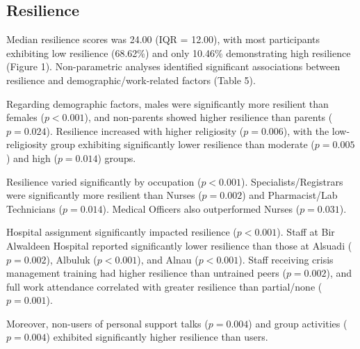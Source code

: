 \documentclass[12pt]{article}
\begin{document}
\subsection{Resilience}
Median resilience scores was 24.00 (IQR = 12.00), with most participants exhibiting low resilience (68.62\%) and only 10.46\% demonstrating high resilience (Figure 1). Non-parametric analyses identified significant associations between resilience and demographic/work-related factors (Table 5).

Regarding demographic factors, males were significantly more resilient than females ($p < 0.001$), and non-parents showed higher resilience than parents ($p = 0.024$). Resilience increased with higher religiosity ($p = 0.006$), with the low-religiosity group exhibiting significantly lower resilience than moderate ($p = 0.005$) and high ($p = 0.014$) groups.

Resilience varied significantly by occupation ($p < 0.001$). Specialists/Registrars were significantly more resilient than Nurses ($p = 0.002$) and Pharmacist/Lab Technicians ($p = 0.014$). Medical Officers also outperformed Nurses ($p = 0.031$).

Hospital assignment significantly impacted resilience ($p < 0.001$). Staff at Bir Alwaldeen Hospital reported significantly lower resilience than those at Alsuadi ($p = 0.002$), Albuluk ($p < 0.001$), and Alnau ($p < 0.001$). Staff receiving crisis management training had higher resilience than untrained peers ($p = 0.002$), and full work attendance correlated with greater resilience than partial/none ($p = 0.001$).

Moreover, non-users of personal support talks ($p = 0.004$) and group activities ($p = 0.004$) exhibited significantly higher resilience than users.
\end{document}
